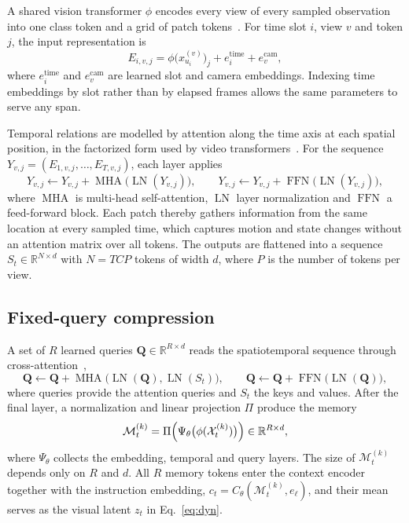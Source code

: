 \documentclass[10pt,a4paper]{article}
\begin{document}
A shared vision transformer $\phi$ encodes every view of every sampled observation into one class token and a grid of patch tokens~\citep{dosovitskiy2021vit}. For time slot $i$, view $v$ and token $j$, the input representation is
\begin{equation}
E_{i,v,j}=\phi\bigl(x^{(v)}_{u_i}\bigr)_j+e^{\mathrm{time}}_i+e^{\mathrm{cam}}_v,
\label{eq:embed}
\end{equation}
where $e^{\mathrm{time}}_i$ and $e^{\mathrm{cam}}_v$ are learned slot and camera embeddings. Indexing time embeddings by slot rather than by elapsed frames allows the same parameters to serve any span.

Temporal relations are modelled by attention along the time axis at each spatial position, in the factorized form used by video transformers~\citep{bertasius2021timesformer,arnab2021vivit}. For the sequence $Y_{v,j}=(E_{1,v,j},\dots,E_{T,v,j})$, each layer applies
\begin{equation}
Y_{v,j}\leftarrow Y_{v,j}+\operatorname{MHA}\bigl(\operatorname{LN}(Y_{v,j})\bigr),\qquad
Y_{v,j}\leftarrow Y_{v,j}+\operatorname{FFN}\bigl(\operatorname{LN}(Y_{v,j})\bigr),
\label{eq:temporal}
\end{equation}
where $\operatorname{MHA}$ is multi-head self-attention, $\operatorname{LN}$ layer normalization and $\operatorname{FFN}$ a feed-forward block. Each patch thereby gathers information from the same location at every sampled time, which captures motion and state changes without an attention matrix over all tokens. The outputs are flattened into a sequence $S_t\in\mathbb R^{N\times d}$ with $N=TCP$ tokens of width $d$, where $P$ is the number of tokens per view.

\subsection{Fixed-query compression}

A set of $R$ learned queries $\mathbf Q\in\mathbb R^{R\times d}$ reads the spatiotemporal sequence through cross-attention~\citep{jaegle2021perceiver},
\begin{equation}
\mathbf Q\leftarrow\mathbf Q+\operatorname{MHA}\bigl(\operatorname{LN}(\mathbf Q),\operatorname{LN}(S_t)\bigr),\qquad
\mathbf Q\leftarrow\mathbf Q+\operatorname{FFN}\bigl(\operatorname{LN}(\mathbf Q)\bigr),
\label{eq:query}
\end{equation}
where queries provide the attention queries and $S_t$ the keys and values. After the final layer, a normalization and linear projection $\Pi$ produce the memory
\begin{equation}
\mathcal M_t^{(k)}=\Pi\Bigl(\Psi_\theta\bigl(\phi(\mathcal X_t^{(k)})\bigr)\Bigr)\in\mathbb R^{R\times d},
\label{eq:memory}
\end{equation}
where $\Psi_\theta$ collects the embedding, temporal and query layers. The size of $\mathcal M_t^{(k)}$ depends only on $R$ and $d$. All $R$ memory tokens enter the context encoder together with the instruction embedding, $c_t=C_\theta(\mathcal M_t^{(k)},e_\ell)$, and their mean serves as the visual latent $z_t$ in Eq.~\eqref{eq:dyn}.
\end{document}
